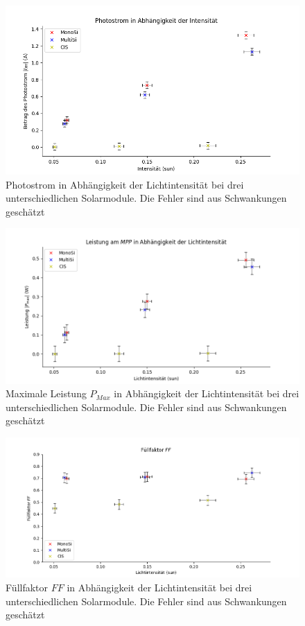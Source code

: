 \begin{figure}[ht]
    \centering
    \includegraphics[width = \linewidth]{Bilder/IPhInt.png}
    \caption{Photostrom in Abhängigkeit der Lichtintensität bei drei unterschiedlichen Solarmodule. Die Fehler 
    sind aus Schwankungen geschätzt}

\end{figure}

\begin{figure}[ht]
    \centering
    \includegraphics[width = \linewidth]{Bilder/MPPInt.png}
    \caption{Maximale Leistung $P_{Max}$ in Abhängigkeit der Lichtintensität bei drei unterschiedlichen Solarmodule. Die Fehler 
    sind aus Schwankungen geschätzt}  
\end{figure}

\begin{figure}[ht]
    \centering
    \includegraphics[width = \linewidth]{Bilder/FFInt.png}
    \caption{Füllfaktor $FF$ in Abhängigkeit der Lichtintensität bei drei unterschiedlichen Solarmodule. Die Fehler 
    sind aus Schwankungen geschätzt}  
\end{figure}

